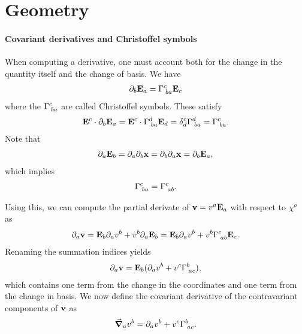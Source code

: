 \section{Geometry}

\paragraph{Covariant derivatives and Christoffel symbols}
When computing a derivative, one must account both for the change in the quantity itself and the change of basis. We have
\begin{align*}
	\partial_{b}\vb{E}_{a} = \Gamma^{c}_{\;ba}\vb{E}_{c}
\end{align*}
where the $\Gamma^{c}_{\;ba}$ are called Christoffel symbols. These satisfy
\begin{align*}
	\vb{E}^{c}\cdot\partial_{b}\vb{E}_{a} = \vb{E}^{c}\cdot\Gamma^{d}_{\;ba}\vb{E}_{d} = \delta_{d}^{c}\Gamma^{d}_{\;ba} = \Gamma^{c}_{\;ba}.
\end{align*}
Note that
\begin{align*}
	\partial_{a}\vb{E}_{b} = \partial_{a}\partial_{b}\vb{x} = \partial_{b}\partial_{a}\vb{x} = \partial_{b}\vb{E}_{a},
\end{align*}
which implies
\begin{align*}
	\Gamma^{c}_{\;ba} = \Gamma^{c}_{\;ab}.
\end{align*}

Using this, we can compute the partial derivate of $\vb{v} = v^{a}\vb{E}_{a}$ with respect to $\chi^{a}$ as
\begin{align*}
	\partial_{a}\vb{v} = \vb{E}_{b}\partial_{a}v^{b} + v^{b}\partial_{a}\vb{E}_{b} = \vb{E}_{b}\partial_{a}v^{b} + v^{b}\Gamma^{c}_{\;ab}\vb{E}_{c}.
\end{align*}
Renaming the summation indices yields
\begin{align*}
	\partial_{a}\vb{v} = \vb{E}_{b}(\partial_{a}v^{b} + v^{c}\Gamma^{b}_{\;ac}),
\end{align*}
which contains one term from the change in the coordinates and one term from the change in basis. We now define the covariant derivative of the contravariant components of $\vb{v}$ as
\begin{align*}
	\grad_{a}{v^{b}} = \partial_{a}v^{b} + v^{c}\Gamma^{b}_{\;ac}.
\end{align*}

